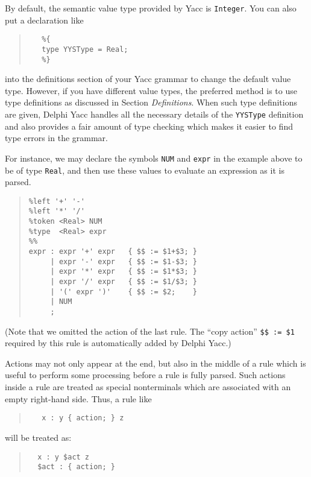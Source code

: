 \documentclass[a4paper]{article}
\begin{document}
By default, the semantic value type provided by Yacc is \verb"Integer". You
can also put a declaration like
\begin{quote}\begin{verbatim}
   %{
   type YYSType = Real;
   %}
\end{verbatim}\end{quote}
into the definitions section of your Yacc grammar to change the default value
type. However, if you have different value types, the preferred method is to
use type definitions as discussed in Section {\em Definitions\/}. When such
type definitions are given, Delphi Yacc handles all the necessary details of the
\verb"YYSType" definition and also provides a fair amount of type checking
which makes it easier to find type errors in the grammar.

For instance, we may declare the symbols \verb"NUM" and \verb"expr" in the
example above to be of type \verb"Real", and then use these values to
evaluate an expression as it is parsed.

\begin{quote}\begin{verbatim}
%left '+' '-'
%left '*' '/'
%token <Real> NUM
%type  <Real> expr
%%
expr : expr '+' expr   { $$ := $1+$3; }
     | expr '-' expr   { $$ := $1-$3; }
     | expr '*' expr   { $$ := $1*$3; }
     | expr '/' expr   { $$ := $1/$3; }
     | '(' expr ')'    { $$ := $2;    }
     | NUM
     ;
\end{verbatim}\end{quote}

(Note that we omitted the action of the last rule. The ``copy action''
\verb"$$ := $1" required by this rule is automatically added by Delphi Yacc.)

Actions may not only appear at the end, but also in the middle of a rule
which is useful to perform some processing before a rule is fully parsed.
Such actions inside a rule are treated as special nonterminals which are
associated with an empty right-hand side. Thus, a rule like
\begin{quote}\begin{verbatim}
   x : y { action; } z
\end{verbatim}\end{quote}
will be treated as:
\begin{quote}\begin{verbatim}
  x : y $act z
  $act : { action; }
\end{verbatim}\end{quote}
\end{document}

